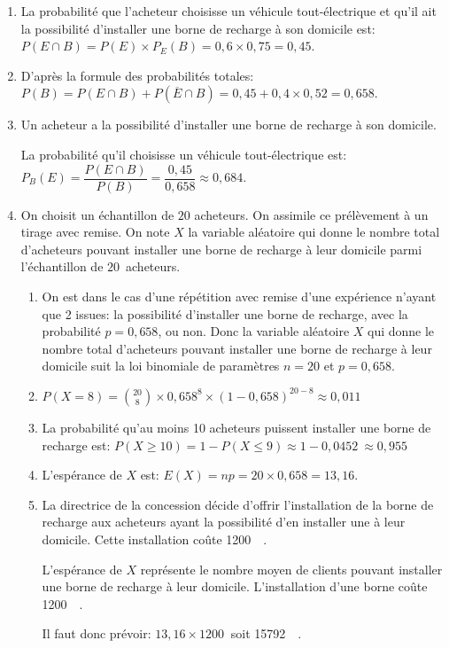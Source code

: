 \documentclass[10pt]{article}
\providecommand{\euro}{\texteuro}
\providecommand{\np}[2][]{{#2~#1}}
\providecommand{\euro}{{\text{€}}}
\providecommand{\ds}{\displaystyle}
\renewcommand{\euro}{\ifmmode\text{\texteuro}\else\texteuro\fi}
\begin{document}
\begin{enumerate}
\item La probabilité que l'acheteur choisisse un véhicule tout-électrique et qu'il ait la possibilité d'installer une borne de recharge à son domicile est:\\
$P(E\cap B) = P(E)\times P_E(B)=0,6\times 0,75 = 0,45$.



\item 
D'après la formule des probabilités totales:\\
$P(B)= P(E\cap B) + P \left (\overline{E}\cap B \right ) = 0,45+0,4\times 0,52=0,658$.

\item Un acheteur a la possibilité d'installer une borne de recharge à son domicile.

La probabilité qu'il choisisse un véhicule tout-électrique est:\\
$P_B(E)=\dfrac{P(E\cap B)}{P(B)} = \dfrac{0,45}{0,658}\approx 0,684$.

\item On choisit un échantillon de $20$ acheteurs. On assimile ce prélèvement à un tirage avec remise.
On note $X$ la variable aléatoire qui donne le nombre total d'acheteurs pouvant installer une borne de recharge à leur domicile parmi l'échantillon de $20$~acheteurs.

	\begin{enumerate}
	\item 
On est dans le cas d'une répétition avec remise d'une expérience n'ayant que 2 issues: la possibilité d'installer une borne de recharge, avec la probabilité $p=0,658$, ou non.
Donc la variable aléatoire $X$ qui donne le nombre total d'acheteurs pouvant installer une borne de recharge à leur domicile suit la loi binomiale de paramètres $n=20$ et $p=0,658$.

		\item $P(X = 8) = \ds\binom{20}{8}\times 0,658^8\times (1-0,658)^{20-8} \approx 0,011$

		\item La probabilité qu'au moins 10 acheteurs puissent installer une borne de recharge est:
$P(X\geqslant 10) = 1-P(X\leqslant 9) \approx 1- \np{0,0452} \approx 0,955$

		\item L'espérance de $X$ est: $E(X)=np=20\times 0,658 = 13,16$.

		\item La directrice de la concession décide d'offrir l'installation de la borne de recharge aux acheteurs ayant la possibilité d'en installer une à leur domicile. Cette installation coûte \np{1200}~\euro.
		


L'espérance de $X$ représente le nombre moyen de clients pouvant installer une borne de recharge à leur domicile. L'installation d'une borne coûte \np{1200}~\euro.

Il faut donc prévoir: $13,16\times \np{1200}$ soit \np{15792}~\euro.
	\end{enumerate}
\end{enumerate}

\bigskip
\end{document}
